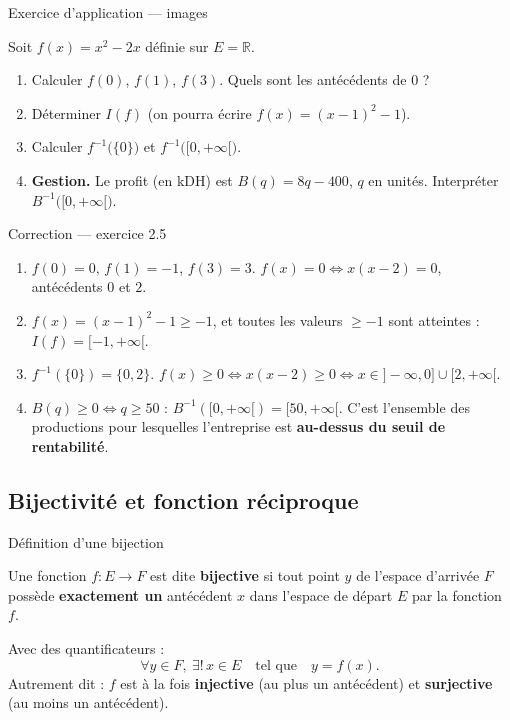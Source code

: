 \documentclass[aspectratio=169,11pt]{beamer}
\newcommand{\R}{\mathbb{R}}
\newcommand{\key}[1]{\textbf{\color{DarkBlue}#1}}
\newcommand{\important}[1]{\textbf{\color{DarkRed}#1}}
\newcommand{\fonc}[3]{#1\colon #2\to #3}
\begin{document}
\begin{frame}{Exercice d'application --- images}
	\begin{exercicebox}[Exercice 2.5]
		Soit $f(x)=x^2-2x$ définie sur $E=\R$.
		\begin{enumerate}
			\item Calculer $f(0)$, $f(1)$, $f(3)$. Quels sont les antécédents de $0$ ?
			\item Déterminer $I(f)$ (on pourra écrire $f(x)=(x-1)^2-1$).
			\item Calculer $f^{-1}\bigl(\{0\}\bigr)$ et $f^{-1}\bigl([0,+\infty[\bigr)$.
			\item \textbf{Gestion.} Le profit (en kDH) est $B(q)=8q-400$, $q$ en unités.
			Interpréter $B^{-1}\bigl([0,+\infty[\bigr)$.
		\end{enumerate}
	\end{exercicebox}
\end{frame}

\begin{frame}{Correction --- exercice 2.5}
	\begin{definitionbox}[Correction]
		\begin{enumerate}
			\item $f(0)=0$, $f(1)=-1$, $f(3)=3$. $f(x)=0\iff x(x-2)=0$, antécédents $0$ et $2$.
			\item $f(x)=(x-1)^2-1\ge -1$, et toutes les valeurs $\ge -1$ sont atteintes :
			$I(f)=[-1,+\infty[$.
			\item $f^{-1}(\{0\})=\{0,2\}$.
			$f(x)\ge 0\iff x(x-2)\ge 0\iff x\in]-\infty,0]\cup[2,+\infty[$.
			\item $B(q)\ge 0\iff q\ge 50$ : $B^{-1}([0,+\infty[)=[50,+\infty[$.
			C'est l'ensemble des productions pour lesquelles l'entreprise
			est \key{au-dessus du seuil de rentabilité}.
		\end{enumerate}
	\end{definitionbox}
\end{frame}

\subsection{Bijectivité et fonction réciproque}

\begin{frame}{Définition d'une bijection}
	\begin{definitionbox}
		Une fonction $\fonc{f}{E}{F}$ est dite \key{bijective} si tout point $y$ de
		l'espace d'arrivée $F$ possède \important{exactement un} antécédent $x$ dans
		l'espace de départ $E$ par la fonction $f$.
	\end{definitionbox}
	\vspace{0.2cm}
	\begin{attentionbox}
		Avec des quantificateurs :
		\[
			\forall y\in F,\ \exists !\, x\in E \quad\text{tel que}\quad y=f(x).
		\]
		Autrement dit : $f$ est à la fois \key{injective} (au plus un antécédent)
		et \key{surjective} (au moins un antécédent).
	\end{attentionbox}
\end{frame}
\end{document}
